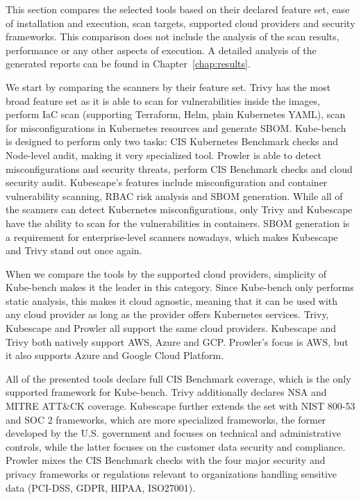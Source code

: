 This section compares the selected tools based on their declared feature set, ease of installation and execution, scan targets, supported cloud providers and security frameworks. This comparison does not include the analysis of the scan results, performance or any other aspects of execution. A detailed analysis of the generated reports can be found in Chapter~\ref{chap:results}.

We start by comparing the scanners by their feature set. Trivy has the most broad feature set as it is able to scan for vulnerabilities inside the images, perform IaC scan (supporting Terraform, Helm, plain Kubernetes YAML), scan for misconfigurations in Kubernetes resources and generate SBOM. Kube-bench is designed to perform only two tasks: CIS Kubernetes Benchmark checks and Node-level audit, making it very specialized tool. Prowler is able to detect misconfigurations and security threats, perform CIS Benchmark checks and cloud security audit. Kubescape's features include misconfiguration and container vulnerability scanning, RBAC risk analysis and SBOM generation. While all of the scanners can detect Kubernetes misconfigurations, only Trivy and Kubescape have the ability to scan for the vulnerabilities in containers. SBOM generation is a requirement for enterprise-level scanners nowadays, which makes Kubescape and Trivy stand out once again.

When we compare the tools by the supported cloud providers, simplicity of Kube-bench makes it the leader in this category. Since Kube-bench only performs static analysis, this makes it cloud agnostic, meaning that it can be used with any cloud provider as long as the provider offers Kubernetes services. Trivy, Kubescape and Prowler all support the same cloud providers. Kubescape and Trivy both natively support AWS, Azure and GCP. Prowler's focus is AWS, but it also supports Azure and Google Cloud Platform.

All of the presented tools declare full CIS Benchmark coverage, which is the only supported framework for Kube-bench. Trivy additionally declares NSA and MITRE ATT\&CK coverage. Kubescape further extends the set with NIST 800-53 and SOC 2 frameworks, which are more specialized frameworks, the former developed by the U.S. government and focuses on technical and administrative controls, while the latter focuses on the customer data security and compliance. Prowler mixes the CIS Benchmark checks with the four major security and privacy frameworks or regulations relevant to organizations handling sensitive data (PCI-DSS, GDPR, HIPAA, ISO27001).

